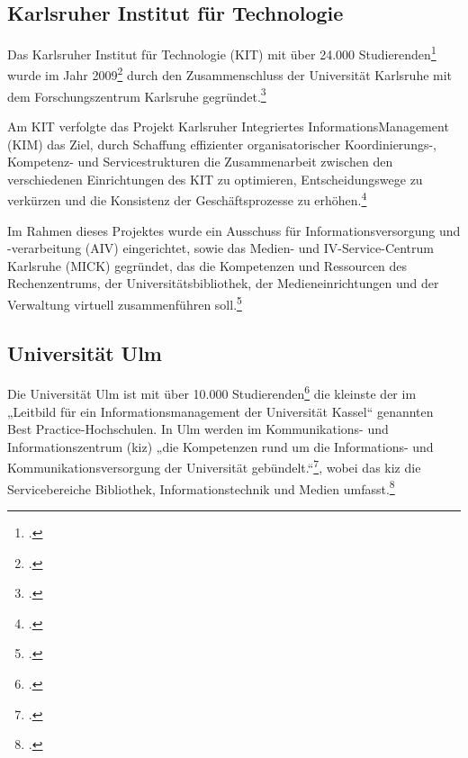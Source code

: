 \subsection{Karlsruher Institut für Technologie}
Das Karlsruher Institut für Technologie (KIT) mit über 24.000 Studierenden\footcite{kit_daten_2015} wurde im Jahr 2009\footcite{kit_daten_2015} durch den Zusammenschluss der Universität Karlsruhe mit dem Forschungszentrum Karlsruhe gegründet.\footcite{kit_geschichte_2014}

Am KIT verfolgte das Projekt Karlsruher Integriertes InformationsManagement (KIM) das Ziel, durch Schaffung effizienter organisatorischer Koordinierungs-, Kompetenz- und Servicestrukturen die Zusammenarbeit zwischen den verschiedenen Einrichtungen des KIT zu optimieren, Entscheidungswege zu verkürzen und die Konsistenz der Geschäftspro\-zesse zu erhöhen.\footcite{kit_kim_start_2014}

Im Rahmen dieses Projektes wurde ein Ausschuss für Informationsversorgung und \mbox{-}\nobreak ver\-arbeitung (AIV) eingerichtet, sowie das Medien- und IV-Service-Centrum Karlsruhe (MICK) gegründet, das die Kompetenzen und Ressourcen des Rechenzentrums, der Universitätsbibliothek, der Medieneinrichtungen und der Verwaltung virtuell zusammenführen soll.\footcite{rummele_spaghetti_2006}

\subsection{Universität Ulm}
Die Universität Ulm ist mit über 10.000 Studierenden\footcite{uniulm_universitat_2015} die kleinste der im „Leitbild für ein Informationsmanagement der Universität Kassel“ genannten Best Practice-Hochschulen. In Ulm werden im Kommunikations- und Informationszentrum (kiz) „die Kompetenzen rund um die Informations- und Kommunikationsversorgung der Universität gebündelt.“\footcite{uniulm_wiruberuns_2015}, wobei das kiz die Servicebereiche Bibliothek, Informationstechnik und Medien umfasst.\footcite{uniulm_kiz_2015}
